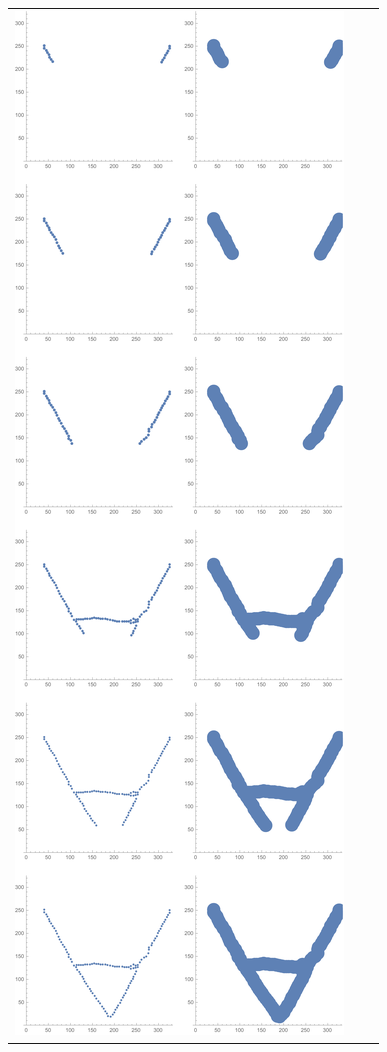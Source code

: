 \documentclass{article}
\begin{document}
\setlength{\tabcolsep}{7pt}
\begin{tabular}{c c c}
	\includegraphics[scale=0.2]{../images/RT-A-cuts.pdf}
	&

\end{tabular}
\end{document}
